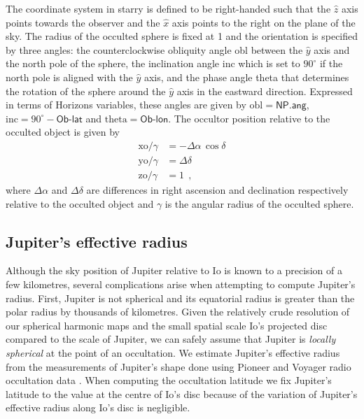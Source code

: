 \documentclass[12pt,dvipsnames]{report}
\newcommand{\hquad}{~~}
\begin{document}
The coordinate system in \textsf{starry} is defined to be right-handed such that the 
$\hat{z}$
axis points towards the observer and the $\hat{x}$ axis points to the right on the 
plane of the sky.
The radius of the occulted sphere is fixed at 1 and the orientation is specified by 
three angles:  the counterclockwise obliquity angle \textsf{obl} between the $\hat{y}$
 axis and the north pole of the sphere, the inclination angle \textsf{inc} which is 
 set to $90^\circ$ if the north pole is aligned with the $\hat{y}$ axis, and the 
 phase angle \textsf{theta} that determines the rotation of the sphere around the 
 $\hat{y}$ axis in the eastward direction.
Expressed in terms of Horizons variables, these angles are given by 
$\mathrm{obl}=\textsf{NP.ang}$, $\mathrm{inc}=90^\circ-\textsf{Ob-lat}$ and 
$\mathrm{theta}=\textsf{Ob-lon}$.
The occultor position relative to the occulted object is given by
\begin{align}
    \mathrm{xo}/\gamma&=-\Delta\alpha\,\cos\delta\\
    \mathrm{yo}/\gamma&=\Delta\delta\\
    \mathrm{zo}/\gamma&=1
    \hquad,
\end{align}
where $\Delta\alpha$ and $\Delta\delta$ are differences in right ascension and declination respectively relative to the occulted object and $\gamma$ is the angular radius of the occulted sphere.

\subsection{Jupiter's effective radius}
\label{ssec:effective_radius}
Although the sky position of Jupiter relative to Io is known to a precision of a few 
kilometres, several complications arise when attempting to compute Jupiter's radius.
First, Jupiter is not spherical and its equatorial radius is greater than the polar 
radius by thousands of kilometres. 
Given the relatively crude resolution of our spherical harmonic maps and the small
spatial scale Io's projected disc compared to the scale of Jupiter, we can safely
assume that Jupiter is \emph{locally spherical} at the point of an occultation. 
We estimate Jupiter's effective radius from the measurements of Jupiter's shape 
done using Pioneer and Voyager radio occultation data \citep[Fig.~7 of][]{1981JGR....86.8721L}.
When computing the occultation latitude we fix Jupiter's latitude to the value at the 
centre of Io's disc because of the variation of Jupiter's effective radius along Io's 
disc is negligible.
\end{document}

